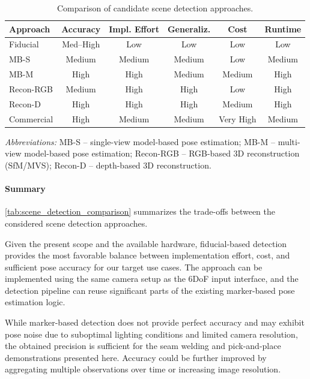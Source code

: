 \begin{table}[t]
\centering
\caption{Comparison of candidate scene detection approaches.}
\label{tab:scene_detection_comparison}

\small

\begin{tabular}{l c c c c c}
\toprule
Approach & Accuracy & Impl. Effort & Generaliz. & Cost & Runtime \\
\midrule
Fiducial & Med--High & Low & Low & Low & Low \\
MB-S & Medium & Medium & Medium & Low & Medium \\
MB-M & High & High & Medium & Medium & High \\
Recon-RGB & Medium & High & High & Low & High \\
Recon-D & High & High & High & Medium & High \\
Commercial & High & Medium & Medium & Very High & Medium \\
\bottomrule
\end{tabular}

\vspace{0.4em}
\footnotesize
\emph{Abbreviations:}
MB-S – single-view model-based pose estimation;
MB-M – multi-view model-based pose estimation;
Recon-RGB – RGB-based 3D reconstruction (SfM/MVS);
Recon-D – depth-based 3D reconstruction.
\end{table}

\paragraph{Summary}
\autoref{tab:scene_detection_comparison} summarizes the trade-offs between the considered scene detection approaches. 

Given the present scope and the available hardware, fiducial-based detection provides the most favorable balance between implementation effort, cost, and sufficient pose accuracy for our target use cases. The approach can be implemented using the same camera setup as the 6DoF input interface, and the detection pipeline can reuse significant parts of the existing marker-based pose estimation logic.

While marker-based detection does not provide perfect accuracy and may exhibit pose noise due to suboptimal lighting conditions and limited camera resolution, the obtained precision is sufficient for the seam welding and pick-and-place demonstrations presented here. Accuracy could be further improved by aggregating multiple observations over time or increasing image resolution.

